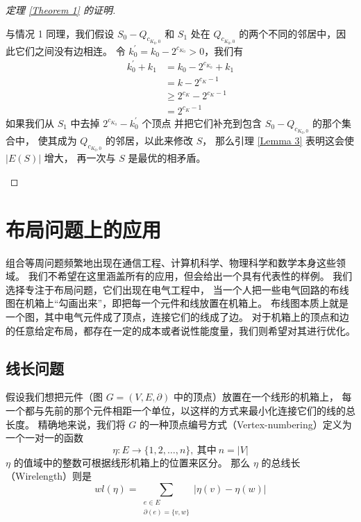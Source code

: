 \documentclass[12pt, a4paper]{article}
\begin{document}
\begin{proof}[定理 \ref{Theorem 1} 的证明]
\begin{enumerate}[(1)]
		与情况 1 同理，我们假设 $S_0 - Q_{c_{K_0, 0}}$ 和 $S_1$ 处在
		$Q_{c_{K_0, 0}}$ 的两个不同的邻居中，因此它们之间没有边相连。
		令 $k_0^{'} = k_0 - 2^{c_{K_0}} > 0$，我们有
		\begin{align*}
		k_0^{'} + k_1 & = k_0 - 2^{c_{K_0}} + k_1 \\
			      & = k - 2^{c_K - 1} \\
			      & \ge 2^{c_K} - 2^{c_K - 1} \\
			      & = 2^{c_K - 1}
		\end{align*}
		如果我们从 $S_1$ 中去掉 $2^{c_{K_0}} − k_0^{'}$ 个顶点
		并把它们补充到包含 $S_0 - Q_{c_{K_0, 0}}$ 的那个集合中，
		使其成为 $Q_{c_{K_0, 0}}$ 的邻居，以此来修改 $S$，
		那么引理 \ref{Lemma 3} 表明这会使 $|E(S)|$ 增大，
		再一次与 $S$ 是最优的相矛盾。
\end{enumerate}
\end{proof}

\section{布局问题上的应用}
\label{Section 3}

组合等周问题频繁地出现在通信工程、计算机科学、物理科学和数学本身这些领域。
我们不希望在这里涵盖所有的应用，但会给出一个具有代表性的样例。
我们选择专注于布局问题，它们出现在电气工程中，
当一个人把一些电气回路的布线图在机箱上“勾画出来”，即把每一个元件和线放置在机箱上。
布线图本质上就是一个图，其中电气元件成了顶点，连接它们的线成了边。
对于机箱上的顶点和边的任意给定布局，都存在一定的成本或者说性能度量，我们则希望对其进行优化。

\subsection{线长问题}
\label{Subsection 3.1}

假设我们想把元件（图 $G = (V, E, \partial)$ 中的顶点）放置在一个线形的机箱上，
每一个都与先前的那个元件相距一个单位，以这样的方式来最小化连接它们的线的总长度。
精确地来说，我们将 $G$ 的一种顶点编号方式（Vertex-numbering）定义为一个一对一的函数
\begin{equation*}
\eta \colon E \rightarrow \{1, 2, \dots, n\},\ \text{其中}\ n = |V|
\end{equation*}
$\eta$ 的值域中的整数可根据线形机箱上的位置来区分。
那么 $\eta$ 的总线长（Wirelength）则是
\begin{equation*}
wl(\eta) = \sum_{\substack{
	e \in E \\
	\partial(e) = \{v, w\}
}} |\eta(v) - \eta(w)|
\end{equation*}
\end{document}
